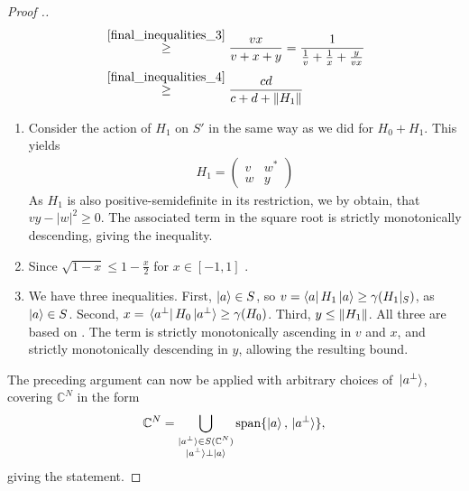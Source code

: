 \documentclass[10pt]{amsart}
\theoremstyle{definition}
\theoremstyle{remark}
\begin{document}
\begin{proof}[Proof {\cite[p. 74]{Childs_2014}}.]
\begin{align}
            &\overset{\ref{final_inequalities_3}}{\geq} \frac{vx}{v+x+y} = \frac{1}{\frac{1}{v}+\frac{1}{x}+\frac{y}{vx}}\\
            &\overset{\ref{final_inequalities_4}}{\geq} \frac{cd}{c+d+\norm{H_1}}
        \end{align}
        \begin{enumerate}[label=(\arabic*), wide]
            \item \label{final_inequalities_2} Consider the action of \(H_1\) on \(S'\) in the same way as we did for \(H_0+H_1\). This yields
            \begin{align}
                H_1 = \begin{pmatrix}
                    v & w^*\\
                    w & y
                \end{pmatrix}
            \end{align}
            As \(H_1\) is also positive-semidefinite in its restriction, we by  obtain, that \(vy-|w|^2 \geq 0\). The associated term in the square root is strictly monotonically descending, giving the inequality.
            \item \label{final_inequalities_3} Since \(\sqrt{1-x} \leq 1-\frac{x}{2}\) for \(x \in [-1, 1]\) \cite[pp. 285-286]{Forster}.
            \item \label{final_inequalities_4} We have three inequalities. First, \(\ket{a} \in S\), so \(v = \bra{a}H_1\ket{a} \geq \gamma(H_1|_S)\), as \(\ket{a} \in S\). Second, \(x = \bra*{a^\perp}H_0\ket*{a^\perp} \geq \gamma(H_0)\). Third, \(y \leq \norm{H_1}\). All three are based on \cite[pp. 234-235]{Horn}. The term is strictly monotonically ascending in \(v\) and \(x\), and strictly monotonically descending in \(y\), allowing the resulting bound.
        \end{enumerate}

        \phantom{}

        The preceding argument can now be applied with arbitrary choices of \(\ket*{a^\perp}\), covering \(\mathbb{C}^N\) in the form
        \begin{align}
            \mathbb{C}^N = \bigcup_{\substack{\ket*{a^\perp} \in S(\mathbb{C}^N)\\\ket*{a^\perp} \perp \ket{a}}} \text{span}\{\ket{a}, \ket*{a^\perp}\},
        \end{align}
        giving the statement.
    \end{proof}
\end{document}
